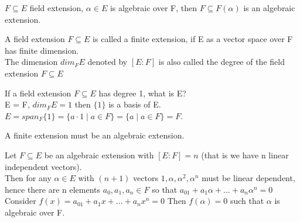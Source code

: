 \documentclass{article}
\begin{document}
\begin{Example}
    $F \subseteq E$ field extension, $\alpha \in E$ is algebraic over F, then $F \subseteq F(\alpha)$ is an algebraic extension. 
\end{Example}

\begin{Def}
    A field extension $F \subseteq E$ is called a finite extension, if E as a vector space over F has finite dimension.
    \\ The dimension $dim_F E$ denoted by $[E:F]$ is also called the degree of the field extension $F \subseteq E$
\end{Def}

\begin{Example}
    If a field extension $F \subseteq E$ has degree 1, what is E?
\\ E = F, $dim_F E = 1$ then $\{1\}$ is a basis of E.
\\$E = span_F\{1\} = \{a \cdot 1 \mid a \in F\} = \{a \mid a \in F\} = F$.
\end{Example}

\begin{theorem}
    A finite extension must be an algebraic extension.
\end{theorem}

\begin{Proof}
    Let $F \subseteq E$ be an algebraic extension with $[E:F] = n$ (that is we have n linear independent vectors).
    \\Then for any $\alpha \in E$ with $(n+1)$ vectors $1, \alpha, \alpha^2, \alpha^n$ must be linear dependent, hence there are n elements $a_0, a_1, a_n \in F$ so that $a_01 + a_1 \alpha + ...+ a_n \alpha ^n = 0$
    \\ Consider $f(x) = a_01 + a_1 x + ...+ a_n x ^n = 0$
    Then $f(\alpha) = 0$ such that $\alpha$ is algebraic over F.
\end{Proof}
\end{document}
